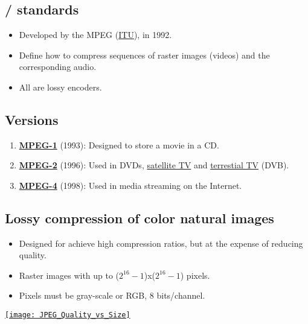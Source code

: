 \chapter{}

\section{/ standards}
\begin{itemize}
\item Developed by the \gls{MPEG} (\href{https://www.itu.int}{ITU}),
  in 1992.
\item Define how to compress sequences of raster images (videos) and the
  corresponding audio.
\item All are lossy encoders.
\end{itemize}

\section{Versions}
\begin{enumerate}
\item \href{https://en.wikipedia.org/wiki/MPEG-1}{\textbf{MPEG-1}}
  (1993): Designed to store a movie in a \gls{CD}.
\item \href{https://en.wikipedia.org/wiki/MPEG-2}{\textbf{MPEG-2}}
  (1996): Used in \glspl{DVD}, \href{https://en.wikipedia.org/wiki/Satellite_television}{satellite TV} and \href{https://en.wikipedia.org/wiki/Digital_television}{terrestial TV} (\gls{DVB}).
\item \href{https://en.wikipedia.org/wiki/MPEG-4}{\textbf{MPEG-4}}
  (1998): Used in media streaming on the Internet.
\end{enumerate}

\section{Lossy compression of color natural images}
\begin{itemize}
\item Designed for achieve high compression ratios, but at the expense of reducing quality.
  \item Raster images with up to ($2^{16}-1$)x($2^{16}-1$) pixels.
  \item Pixels must be gray-scale or \gls{RGB}, 8 bits/channel.
\end{itemize}
\vspace{-2ex}
\begin{center}
  \href{https://www.thewebmaster.com/jpeg-definitive-guide/}{\texttt{[image: JPEG\_Quality\_vs\_Size]}}
\end{center}

